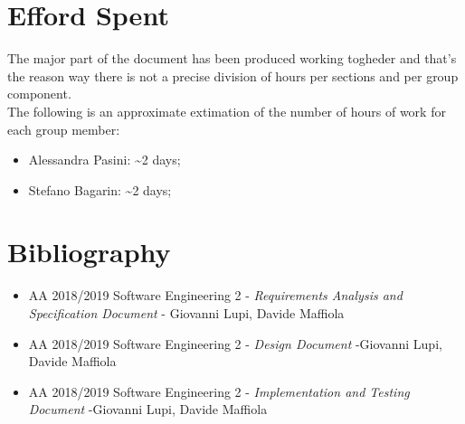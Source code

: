 \section{Efford Spent}
The major part of the document has been produced working togheder and that's the reason way there is not a precise division of hours per sections and per group component.\\
The following is an approximate extimation of the number of hours of work for each group member:
\begin{itemize}
\item Alessandra Pasini: \textasciitilde 2 days;
\item Stefano Bagarin: \textasciitilde 2 days;
\end{itemize}

\section{Bibliography}
\begin{itemize}
	\item AA 2018/2019 Software Engineering 2 - \emph{Requirements Analysis and Specification Document} - Giovanni Lupi, 			Davide Maffiola
	\item  AA 2018/2019 Software Engineering 2 - \emph{Design Document} -Giovanni Lupi, Davide Maffiola
	\item  AA 2018/2019 Software Engineering 2 - \emph{Implementation and Testing Document} -Giovanni Lupi, Davide Maffiola
\end{itemize}